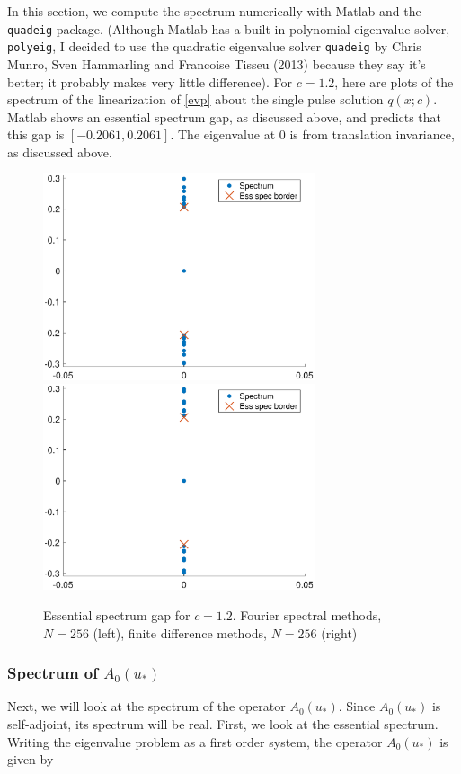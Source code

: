 \documentclass[12pt]{article}
\begin{document}
In this section, we compute the spectrum numerically with Matlab and the \texttt{quadeig} package. (Although Matlab has a built-in polynomial eigenvalue solver, \texttt{polyeig}, I decided to use the quadratic eigenvalue solver \texttt{quadeig} by Chris Munro, Sven Hammarling and Francoise Tisseu (2013) because they say it's better; it probably makes very little difference). For $c = 1.2$, here are plots of the spectrum of the linearization of \eqref{evp} about the single pulse solution $q(x; c)$. Matlab shows an essential spectrum gap, as discussed above, and predicts that this gap is $[-0.2061, 0.2061]$. The eigenvalue at 0 is from translation invariance, as discussed above.

\begin{figure}[H]
\centering
\includegraphics[width=8cm]{essspecboundsF256.eps}
\includegraphics[width=8cm]{essspecboundsFD256.eps}
\caption{Essential spectrum gap for $c = 1.2$. Fourier spectral methods, $N = 256$ (left), finite difference methods, $N = 256$ (right)}
\end{figure}

\subsubsection{\texorpdfstring{Spectrum of $A_0(u_*)$}{}}

Next, we will look at the spectrum of the operator $A_0(u_*)$. Since $A_0(u_*)$ is self-adjoint, its spectrum will be real. First, we look at the essential spectrum. Writing the eigenvalue problem as a first order system, the operator $A_0(u_*)$ is given by
\end{document}
